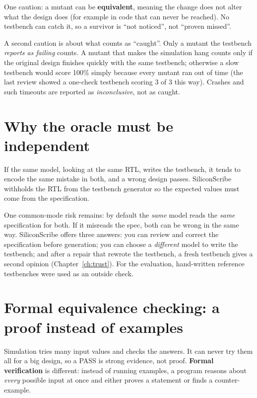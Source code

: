 One caution: a mutant can be \textbf{equivalent}, meaning the change does not alter what the design does (for example in code that can never be reached). No testbench can catch it, so a survivor is ``not noticed'', not ``proven missed''.

A second caution is about what counts as ``caught''. Only a mutant the testbench \emph{reports as failing} counts. A mutant that makes the simulation hang counts only if the original design finishes quickly with the same testbench; otherwise a slow testbench would score 100\% simply because every mutant ran out of time (the last review showed a one-check testbench scoring 3 of 3 this way). Crashes and such timeouts are reported as \emph{inconclusive}, not as caught.

\section{Why the oracle must be independent}

\begin{keyidea}
If the same model, looking at the same RTL, writes the testbench, it tends to encode the same mistake in both, and a wrong design passes. SiliconScribe withholds the RTL from the testbench generator so the expected values must come from the specification.
\end{keyidea}

\begin{warnbox}
One common-mode risk remains: by default the \emph{same} model reads the \emph{same} specification for both. If it misreads the spec, both can be wrong in the same way. SiliconScribe offers three answers: you can review and correct the specification before generation; you can choose a \emph{different} model to write the testbench; and after a repair that rewrote the testbench, a fresh testbench gives a second opinion (Chapter~\ref{ch:trust}). For the evaluation, hand-written reference testbenches were used as an outside check.
\end{warnbox}

\section{Formal equivalence checking: a proof instead of examples}
\label{sec:formalbasics}

Simulation tries many input values and checks the answers. It can never try them all for a big design, so a PASS is strong evidence, not proof. \textbf{Formal verification} is different: instead of running examples, a program reasons about \emph{every} possible input at once and either proves a statement or finds a counter-example.

